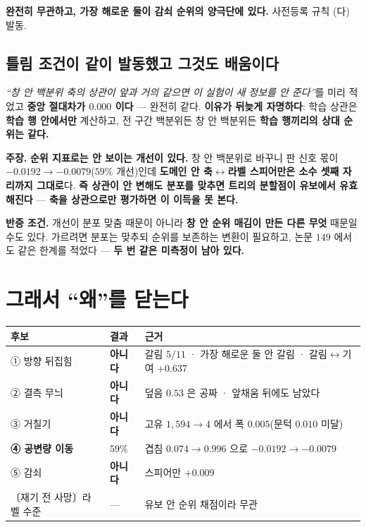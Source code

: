 \documentclass[10pt,a4paper]{article}
\newcommand{\claim}[2]{\begin{claimbox}\textbf{주장.} #1\par\smallskip
  \textcolor{gray!70}{\textbf{반증 조건.} #2}\end{claimbox}}
\begin{document}
\textbf{완전히 무관하고, 가장 해로운 둘이 감쇠 순위의 양극단에 있다.} 사전등록 규칙
(다) 발동.

\subsection*{틀림 조건이 같이 발동했고 그것도 배움이다}

\emph{``창 안 백분위 축의 상관이 앞과 거의 같으면 이 실험이 새 정보를 안 준다''}를
미리 적었고 \textbf{중앙 절대차가 $0.000$ 이다} --- 완전히 같다. \textbf{이유가 뒤늦게
자명하다}: 학습 상관은 \textbf{학습 행 안에서만} 계산하고, 전 구간 백분위든 창 안
백분위든 \textbf{학습 행끼리의 상대 순위는 같다.}

\claim{\textbf{순위 지표로는 안 보이는 개선이 있다.} 창 안 백분위로 바꾸니 판 신호
몫이 $-0.0192 \to -0.0079$($59\%$ 개선)인데 \textbf{도메인 안 축$\leftrightarrow$라벨
스피어만은 소수 셋째 자리까지 그대로}다. \textbf{즉 상관이 안 변해도 분포를 맞추면
트리의 분할점이 유보에서 유효해진다} --- \textbf{축을 상관으로만 평가하면 이 이득을
못 본다.}}
{개선이 분포 맞춤 때문이 아니라 \textbf{창 안 순위 매김이 만든 다른 무엇} 때문일 수도
있다. 가르려면 분포는 맞추되 순위를 보존하는 변환이 필요하고, 논문 $149$ 에서도
같은 한계를 적었다 --- \textbf{두 번 같은 미측정이 남아 있다.}}

\section{그래서 ``왜''를 닫는다}

\begin{center}
\begin{tabular}{lll}
\toprule
후보 & 결과 & 근거 \\
\midrule
① 방향 뒤집힘 & \textbf{아니다} & 갈림 $5/11$ · 가장 해로운 둘 안 갈림 · 갈림$\leftrightarrow$기여 $+0.637$ \\
② 결측 무늬 & \textbf{아니다} & 덮음 $0.53$ 은 공짜 · 앞채움 뒤에도 남았다 \\
③ 거칠기 & \textbf{아니다} & 고유 $1{,}594 \to 4$ 에서 폭 $0.005$(문턱 $0.010$ 미달) \\
\textbf{④ 공변량 이동} & \textbf{$59\%$} & 겹침 $0.074 \to 0.996$ 으로 $-0.0192 \to -0.0079$ \\
⑤ 감쇠 & \textbf{아니다} & 스피어만 $+0.009$ \\
\midrule
〔재기 전 사망〕라벨 수준 & --- & 유보 안 순위 채점이라 무관 \\
\bottomrule
\end{tabular}
\end{center}
\end{document}
